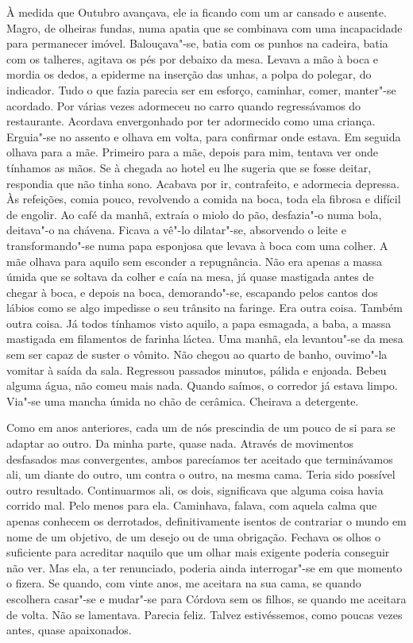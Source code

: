 À medida que Outubro avançava, ele ia ficando com um ar cansado e
ausente. Magro, de olheiras fundas, numa apatia que se combinava com uma
incapacidade para permanecer imóvel. Balouçava"-se, batia com os punhos
na cadeira, batia com os talheres, agitava os pés por debaixo da mesa.
Levava a mão à boca e mordia os dedos, a epiderme na inserção das unhas,
a polpa do polegar, do indicador. Tudo o que fazia parecia ser em
esforço, caminhar, comer, manter"-se acordado. Por várias vezes
adormeceu no carro quando regressávamos do restaurante. Acordava
envergonhado por ter adormecido como uma criança. Erguia"-se no assento
e olhava em volta, para confirmar onde estava. Em seguida olhava para a
mãe. Primeiro para a mãe, depois para mim, tentava ver onde tínhamos as
mãos. Se à chegada ao hotel eu lhe sugeria que se fosse deitar,
respondia que não tinha sono. Acabava por ir, contrafeito, e adormecia
depressa. Às refeições, comia pouco, revolvendo a comida na boca, toda
ela fibrosa e difícil de engolir. Ao café da manhã, extraía o miolo do
pão, desfazia"-o numa bola, deitava"-o na chávena. Ficava a vê"-lo
dilatar"-se, absorvendo o leite e transformando"-se numa papa esponjosa
que levava à boca com uma colher. A mãe olhava para aquilo sem esconder
a repugnância. Não era apenas a massa úmida que se soltava da colher e
caía na mesa, já quase mastigada antes de chegar à boca, e depois na
boca, demorando"-se, escapando pelos cantos dos lábios como se algo
impedisse o seu trânsito na faringe. Era outra coisa. Também outra
coisa. Já todos tínhamos visto aquilo, a papa esmagada, a baba, a massa
mastigada em filamentos de farinha láctea. Uma manhã, ela levantou"-se
da mesa sem ser capaz de suster o vômito. Não chegou ao quarto de banho,
ouvimo"-la vomitar à saída da sala. Regressou passados minutos, pálida e
enjoada. Bebeu alguma água, não comeu mais nada. Quando saímos, o
corredor já estava limpo. Via"-se uma mancha úmida no chão de cerâmica.
Cheirava a detergente.

Como em anos anteriores, cada um de nós prescindia de um pouco de si
para se adaptar ao outro. Da minha parte, quase nada. Através de
movimentos desfasados mas convergentes, ambos parecíamos ter aceitado
que terminávamos ali, um diante do outro, um contra o outro, na mesma
cama. Teria sido possível outro resultado. Continuarmos ali, os dois,
significava que alguma coisa havia corrido mal. Pelo menos para ela.
Caminhava, falava, com aquela calma que apenas conhecem os derrotados,
definitivamente isentos de contrariar o mundo em nome de um objetivo,
de um desejo ou de uma obrigação. Fechava os olhos o suficiente para
acreditar naquilo que um olhar mais exigente poderia conseguir não ver.
Mas ela, a ter renunciado, poderia ainda interrogar"-se em que momento o
fizera. Se quando, com vinte anos, me aceitara na sua cama, se quando
escolhera casar"-se e mudar"-se para Córdova sem os filhos, se quando me
aceitara de volta. Não se lamentava. Parecia feliz. Talvez estivéssemos,
como poucas vezes antes, quase apaixonados.


